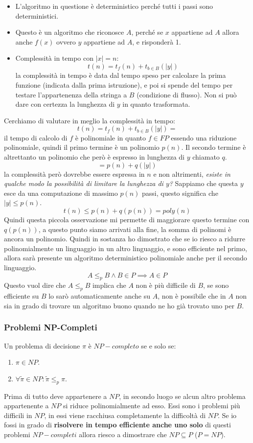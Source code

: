 \documentclass{article}
\begin{document}
\begin{itemize}
    \item L'algoritmo in questione è deterministico perché tutti i passi sono deterministici.
    \item Questo è un algoritmo che riconosce $A$, perché se $x$ appartiene ad $A$ allora
          anche $f(x)$ ovvero $y$ appartiene ad $A$, e risponderà 1.
    \item Complessità in tempo con $|x|=n$:
          $$t(n)=t_f(n)+ t_{b\in B}(|y|)$$
          la complessità in tempo è data dal tempo speso per calcolare la prima funzione (indicata
          dalla prima istruzione), e poi si spende del tempo per testare l'appartenenza della
          stringa a $B$ (condizione di flusso). Non si può dare con certezza
          la lunghezza di $y$ in quanto trasformata.
\end{itemize}
Cerchiamo di valutare in meglio la complessità in tempo:
$$t(n)=t_f(n)+t_{b\in B}(|y|)=$$
il tempo di calcolo di $f$ è polinomiale in quanto $f\in FP$ essendo una riduzione polinomiale,
quindi il primo termine è un polinomio $p(n)$. Il secondo termine è altrettanto un polinomio
che però è espresso in lunghezza di $y$ chiamato $q$.
$$=p(n)+q(|y|)$$
la complessità però dovrebbe essere espressa in $n$ e non altrimenti, \textit{esiste
    in qualche modo la possibilità di limitare la lunghezza di $y$?} Sappiamo che questa
$y$ esce da una computazione di massimo $p(n)$ passi, questo significa che $|y|\leq p(n)$.
$$t(n)\leq p(n)+q(p(n))=poly(n)$$
Quindi questa piccola osservazione mi permette di maggiorare questo termine con $q(p(n))$,
a questo punto siamo arrivati alla fine, la somma di polinomi è ancora un polinomio.
\newline\newline
Quindi in sostanza ho dimostrato che se io riesco a ridurre polinomialmente un linguaggio
in un altro linguaggio, e sono efficiente nel primo, allora sarà presente un algoritmo
deterministico polinomiale anche per il secondo linguaggio.
$$A\leq_p B\land B\in P\implies A\in P$$
Questo vuol dire che $A\leq_p B$ implica che $A$ non è più difficile di $B$, se sono efficiente
su $B$ lo sarò automaticamente anche su $A$, non è possibile che in $A$ non sia in grado
di trovare un algoritmo buono quando ne ho già trovato uno per $B$.

\subsubsection{Problemi NP-Completi}
Un problema di decisione $\pi$ è $NP-completo$ se e solo se:
\begin{enumerate}
    \item $\pi\in NP$.
    \item $\forall\tilde{\pi}\in NP:\tilde{\pi}\leq_p\pi$.
\end{enumerate}
Prima di tutto deve appartenere a $NP$, in secondo luogo se alcun altro problema appartenente
a $NP$ si riduce polinomialmente ad esso.
Essi sono i problemi più difficili in $NP$, in essi viene racchiusa completamente la difficoltà
di $NP$.
Se io fossi in grado di \textbf{risolvere in tempo efficiente anche uno solo} di questi problemi
$NP-completi$ allora riesco a dimostrare che $NP\subseteq P$ ($P=NP$).
\end{document}
